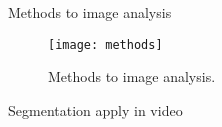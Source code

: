 \begin{frame}[t]{Methods to image analysis}
    \begin{figure}
        \centering
        \texttt{[image: methods]}
        \caption{Methods to image analysis. \cite{lin2014microsoft}}
    \end{figure}
\end{frame}

\begin{frame}[t]{Segmentation apply in video} 
\end{frame}
